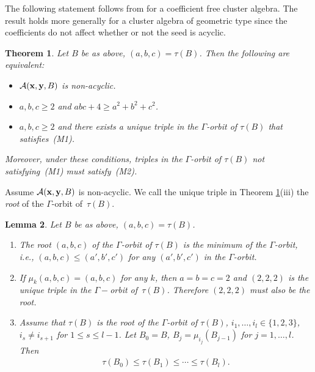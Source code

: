 \documentclass[11pt]{article}
\numberwithin{equation}{section}
\newtheorem{Theorem}{Theorem}[section]
\newtheorem{Lemma}[Theorem]{Lemma}
\begin{document}
The following statement follows from \cite[Theorem~1.2, Lemma~2.1]{BBH} for a coef\/f\/icient free cluster algebra. The result holds more generally for a cluster algebra of geometric type since the coef\/f\/icients do not af\/fect whether or not the seed is acyclic.
\begin{Theorem}
\label{cyclic}
Let $B$ be as above, $(a,b,c)=\tau(B)$. Then the following are equivalent:
\begin{itemize}\itemsep=0pt
\item[\rm(i)]$\mathcal{A}({\bf x},{\bf y},B)$ is non-acyclic.

\item[\rm(ii)] $a,b,c \geq 2$ and $abc+4\ge a^2+b^2+c^2$.

\item[\rm(iii)] $a,b,c\ge 2$ and there exists a unique triple in the $\Gamma$-orbit of $\tau(B)$ that satisfies~{\rm(M1)}.
\end{itemize}
Moreover, under these conditions, triples in the $\Gamma$-orbit of $\tau(B)$ not satisfying~{\rm(M1)} must sa\-tis\-fy~{\rm(M2)}.
\end{Theorem}

Assume $\mathcal{A}({\bf x},{\bf y},B)$ is non-acyclic. We call the unique triple in Theorem \ref{cyclic}(iii) the \emph{root} of the $\Gamma$-orbit of~$\tau(B)$.


\begin{Lemma}\label{lemma:chain inequality}
Let $B$ be as above, $(a,b,c)=\tau(B)$.
\begin{enumerate}\itemsep=0pt
\item[$(i)$] The root $(a,b,c)$ of the $\Gamma$-orbit of $\tau(B)$ is the minimum of the $\Gamma$-orbit, i.e., $(a,b,c)\le(a',b',c')$ for any $(a',b',c')$ in the $\Gamma$-orbit.

\item[$(ii)$] If $\mu_k(a,b,c)=(a,b,c)$ for any $k$, then $a=b=c=2$ and $(2,2,2)$ is the unique triple in the $\Gamma-$orbit of~$\tau(B)$. Therefore $(2,2,2)$ must also be the root.

\item[$(iii)$] Assume that $\tau(B)$ is the root of the $\Gamma$-orbit of $\tau(B)$,  $i_1,\dots,i_l\in\{1,2,3\}$, $i_s\neq i_{s+1}$ for $1\le s\le l-1$.
Let $B_0=B$, $B_j=\mu_{i_j}(B_{j-1})$ for $j=1,\dots,l$. Then
\begin{gather*}\tau(B_0)\le\tau(B_1)\le\cdots\le\tau(B_l).
\end{gather*}
\end{enumerate}
\end{Lemma}
\end{document}
